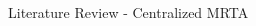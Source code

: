 \begin{frame}{Literature Review - Centralized MRTA}
\begin{columns}
\begin{column}{0.5\textwidth}
\begin{figure}
        \vfill
    \addtocounter{subfigure}{-1}
    \end{figure}
    \end{column}
    \end{columns}
\end{frame}

